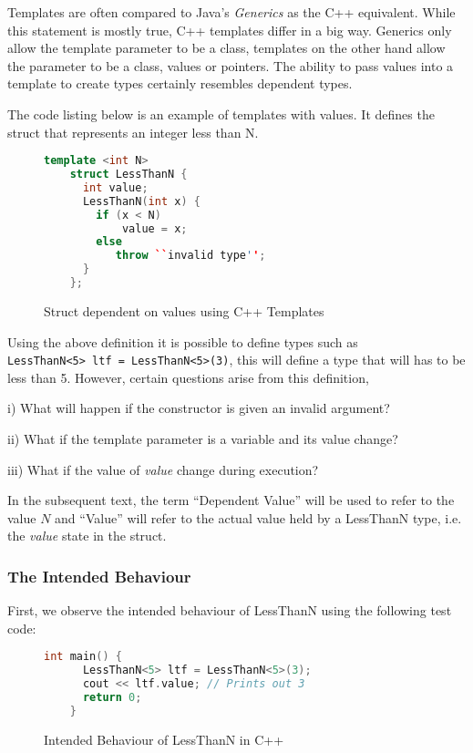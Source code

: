 \documentclass[a4paper,12pt]{report}
\begin{document}
\par
Templates are often compared to Java's \textit{Generics} \cite{javaGenerics} 
as the C++ equivalent. While this statement is mostly true, C++ templates 
differ in a big way. 
Generics only allow the template parameter to be a class, templates on the other 
hand allow the parameter to be a class, values or pointers. The ability to 
pass values into a template to create types certainly resembles dependent types.

\par
The code listing below is an example of templates with values. It defines the 
struct that represents an integer less than N. 

\begin{figure}[H]
  \begin{lstlisting}[language=c++]     
    template <int N>
    struct LessThanN {
      int value;
      LessThanN(int x) {
        if (x < N)
            value = x;
        else
           throw ``invalid type'';
      }
    };
  \end{lstlisting}
  \caption{Struct dependent on values using C++ Templates}
\end{figure}

\par
Using the above definition it is possible to define types such as \\
\verb+LessThanN<5> ltf = LessThanN<5>(3)+, this will define a type that will has 
to be less than 5. However, certain questions arise from this definition, 

i) What will happen if the constructor is given an invalid argument? 

ii) What if the template parameter is a variable and its 
value change? 

iii) What if the value of \textit{value} change during execution?

In the subsequent text, the term ``Dependent Value'' will be used to refer to the 
value $N$ and ``Value'' will refer to the actual value held by a LessThanN type, 
i.e. the \textit{value} state in the struct. 

\subsubsection{The Intended Behaviour}
First, we observe the intended behaviour of LessThanN using the following test 
code:
\begin{figure}[H]
  \begin{lstlisting}[language=c++]     
    int main() {
      LessThanN<5> ltf = LessThanN<5>(3);
      cout << ltf.value; // Prints out 3
      return 0;
    }
  \end{lstlisting}
  \caption{Intended Behaviour of LessThanN in C++}
\end{figure}
\end{document}
